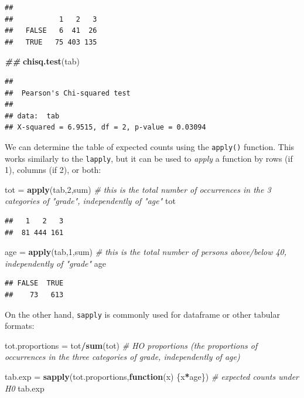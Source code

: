 \documentclass[
]{book}
\newenvironment{Shaded}{\begin{snugshade}}{\end{snugshade}}
\newcommand{\CommentTok}[1]{\textcolor[rgb]{0.56,0.35,0.01}{\textit{#1}}}
\newcommand{\ControlFlowTok}[1]{\textcolor[rgb]{0.13,0.29,0.53}{\textbf{#1}}}
\newcommand{\DecValTok}[1]{\textcolor[rgb]{0.00,0.00,0.81}{#1}}
\newcommand{\DocumentationTok}[1]{\textcolor[rgb]{0.56,0.35,0.01}{\textbf{\textit{#1}}}}
\newcommand{\FunctionTok}[1]{\textcolor[rgb]{0.13,0.29,0.53}{\textbf{#1}}}
\newcommand{\NormalTok}[1]{#1}
\newcommand{\OtherTok}[1]{\textcolor[rgb]{0.56,0.35,0.01}{#1}}
\newcommand{\SpecialCharTok}[1]{\textcolor[rgb]{0.81,0.36,0.00}{\textbf{#1}}}
\begin{document}
\begin{verbatim}
##        
##           1   2   3
##   FALSE   6  41  26
##   TRUE   75 403 135
\end{verbatim}

\begin{Shaded}
\begin{Highlighting}[]
\DocumentationTok{\#\#}
\FunctionTok{chisq.test}\NormalTok{(tab)}
\end{Highlighting}
\end{Shaded}

\begin{verbatim}
## 
##  Pearson's Chi-squared test
## 
## data:  tab
## X-squared = 6.9515, df = 2, p-value = 0.03094
\end{verbatim}

We can determine the table of expected counts using the \texttt{apply()} function.
This works similarly to the \texttt{lapply}, but it can be used to \emph{apply} a function by rows (if 1), columns (if 2), or both:

\begin{Shaded}
\begin{Highlighting}[]
\NormalTok{tot }\OtherTok{=} \FunctionTok{apply}\NormalTok{(tab,}\DecValTok{2}\NormalTok{,sum) }\CommentTok{\# this is the total number of occurrences in the 3 categories of "grade", independently of "age"}
\NormalTok{tot}
\end{Highlighting}
\end{Shaded}

\begin{verbatim}
##   1   2   3 
##  81 444 161
\end{verbatim}

\begin{Shaded}
\begin{Highlighting}[]
\NormalTok{age }\OtherTok{=} \FunctionTok{apply}\NormalTok{(tab,}\DecValTok{1}\NormalTok{,sum) }\CommentTok{\# this is the total number of persons above/below 40, independently of "grade"}
\NormalTok{age}
\end{Highlighting}
\end{Shaded}

\begin{verbatim}
## FALSE  TRUE 
##    73   613
\end{verbatim}

On the other hand, \texttt{sapply} is commonly used for dataframe or other tabular formats:

\begin{Shaded}
\begin{Highlighting}[]
\NormalTok{tot.proportions }\OtherTok{=}\NormalTok{ tot}\SpecialCharTok{/}\FunctionTok{sum}\NormalTok{(tot) }\CommentTok{\# HO proportions (the proportions of occurrences in the three categories of grade, independently of age)}

\NormalTok{tab.exp }\OtherTok{=} \FunctionTok{sapply}\NormalTok{(tot.proportions,}\ControlFlowTok{function}\NormalTok{(x) \{x}\SpecialCharTok{*}\NormalTok{age\}) }\CommentTok{\# expected counts under H0}
\NormalTok{tab.exp}
\end{Highlighting}
\end{Shaded}
\end{document}
